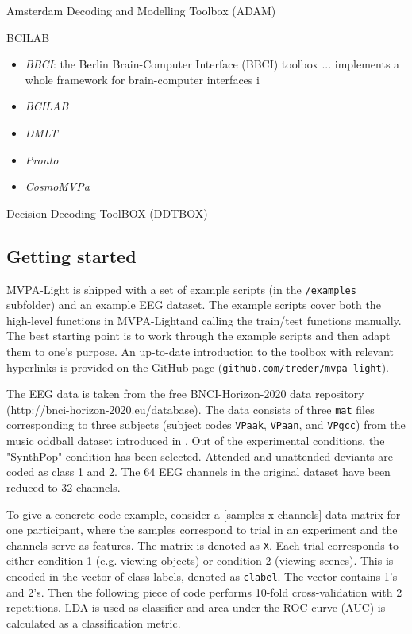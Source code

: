 \documentclass[utf8]{frontiersSCNS} %
\newcommand{\mvpa}{MVPA-Light}
\newcommand{\ttt}[1]{\texttt{#1}}
\begin{document}
Amsterdam Decoding and Modelling Toolbox (ADAM)\cite{Fahrenfort2018FromADAM}

\cite{Blankertz2016TheControl}

BCILAB \cite{Kothe2013BCILAB:Development}

\begin{itemize}
    \item \textit{BBCI}: the Berlin Brain-Computer Interface (BBCI) toolbox ... implements a whole framework for brain-computer interfaces i  
    \item \textit{BCILAB} 
    \item \textit{DMLT} 
    \item \textit{Pronto}
    \item \textit{CosmoMVPa} 

\end{itemize}

Decision Decoding ToolBOX (DDTBOX)

\subsection{Getting started}

\mvpa{} is shipped with a set of example scripts (in the \ttt{/examples} subfolder) and an example EEG dataset. The example scripts cover both the high-level functions in \mvpa and calling the train/test functions manually. The best starting point is to work through the example scripts and then adapt them to one's purpose. An up-to-date introduction to the toolbox with relevant hyperlinks is provided on the GitHub page (\ttt{github.com/treder/mvpa-light}).

The EEG data is taken from the free BNCI-Horizon-2020 data repository (http://bnci-horizon-2020.eu/database). The data consists of three \ttt{mat} files corresponding to three subjects (subject codes \ttt{VPaak}, \ttt{VPaan}, and \ttt{VPgcc}) from the music oddball dataset introduced in \cite{Treder2014}. Out of the experimental conditions, the "SynthPop" condition has been selected. Attended and unattended deviants are coded as class 1 and 2. The 64 EEG channels in the original dataset have been reduced to 32 channels.

To give a concrete code example, consider a [samples x channels] data matrix for one participant, where the samples correspond to trial in an experiment and the channels serve as features. The matrix is denoted as \ttt{X}. Each trial corresponds to either condition 1 (e.g. viewing objects) or condition 2 (viewing scenes). This is encoded in the vector of class labels, denoted as \ttt{clabel}. The vector contains 1's and 2's. Then the following piece of code performs 10-fold cross-validation with 2 repetitions. LDA is used as classifier and area under the ROC curve (AUC) is calculated as a classification metric.
\end{document}
